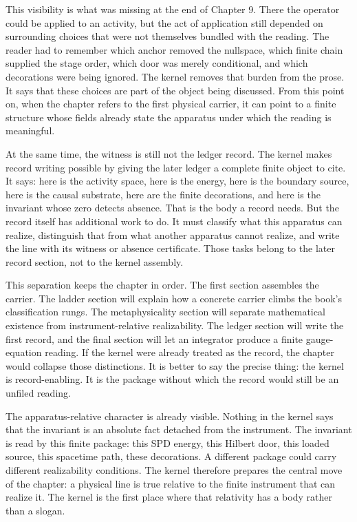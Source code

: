This visibility is what was missing at the end of Chapter 9. There the operator
could be applied to an activity, but the act of application still depended on
surrounding choices that were not themselves bundled with the reading. The reader
had to remember which anchor removed the nullspace, which finite chain supplied
the stage order, which door was merely conditional, and which decorations were
being ignored. The kernel removes that burden from the prose. It says that these
choices are part of the object being discussed. From this point on, when the
chapter refers to the first physical carrier, it can point to a finite structure
whose fields already state the apparatus under which the reading is meaningful.

At the same time, the witness is still not the ledger record. The kernel makes
record writing possible by giving the later ledger a complete finite object to
cite. It says: here is the activity space, here is the energy, here is the
boundary source, here is the causal substrate, here are the finite decorations,
and here is the invariant whose zero detects absence. That is the body a record
needs. But the record itself has additional work to do. It must classify what
this apparatus can realize, distinguish that from what another apparatus cannot
realize, and write the line with its witness or absence certificate. Those tasks
belong to the later record section, not to the kernel assembly.

This separation keeps the chapter in order. The first section assembles the
carrier. The ladder section will explain how a concrete carrier climbs the book's
classification rungs. The metaphysicality section will separate mathematical
existence from instrument-relative realizability. The ledger section will write
the first record, and the final section will let an integrator produce a finite
gauge-equation reading. If the kernel were already treated as the record, the
chapter would collapse those distinctions. It is better to say the precise thing:
the kernel is record-enabling. It is the package without which the record would
still be an unfiled reading.

The apparatus-relative character is already visible. Nothing in the kernel says
that the invariant is an absolute fact detached from the instrument. The
invariant is read by this finite package: this SPD energy, this Hilbert door,
this loaded source, this spacetime path, these decorations. A different package
could carry different realizability conditions. The kernel therefore prepares the
central move of the chapter: a physical line is true relative to the finite
instrument that can realize it. The kernel is the first place where that
relativity has a body rather than a slogan.

